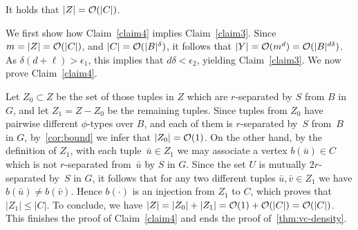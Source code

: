   \begin{claim}\label{claim4}
It holds that $|Z|=\mathcal{O}(|C|)$.
  \end{claim}
  
  We first show how Claim~\ref{claim4} implies Claim~\ref{claim3}.
  Since $m=|Z|=\mathcal{O}(|C|)$,
  and $|C|=\mathcal{O}(|B|^\delta)$,
  it follows that $|Y|=\mathcal{O}(m^d)=\mathcal{O}(|B|^{d\delta})$. As $\delta(d+\ell)>\epsilon_1$, this implies that $d\delta<\epsilon_2$, yielding Claim~\ref{claim3}.
  We now prove Claim~\ref{claim4}.

\medskip
  Let $Z_0\subset Z$ be the set of 
  those tuples in $Z$ which are $r$-separated by $S$ from $B$ in $G$,
  and let $Z_1=Z-Z_0$ be the remaining  tuples.
  Since tuples from $Z_0$ have pairwise different $\phi$-types over $B$, and each of them is $r$-separated by~$S$ from~$B$ in $G$, by~\autoref{cor:bound} we infer that $|Z_0|=\mathcal{O}(1)$.  
 On the other hand, by the definition of $Z_1$, with each tuple~$\bar u\in Z_1$ we may associate a vertex $b(\bar u)\in C$ which is not $r$-separated from~$\bar u$ by $S$ in $G$.
 Since the set $U$ is mutually $2r$-separated by~$S$ in $G$, it follows that for any two different tuples $\bar u,\bar v\in Z_1$ we have $b(\bar u)\neq b(\bar v)$.
 Hence $b(\cdot)$ is an injection from $Z_1$ to $C$, which proves that $|Z_1|\leq |C|$.
 To conclude, we have $|Z|=|Z_0|+|Z_1|=\mathcal{O}(1)+\mathcal{O}(|C|)=\mathcal{O}(|C|)$. This finishes the proof of Claim~\ref{claim4} and ends the proof of~\autoref{thm:vc-density}.


